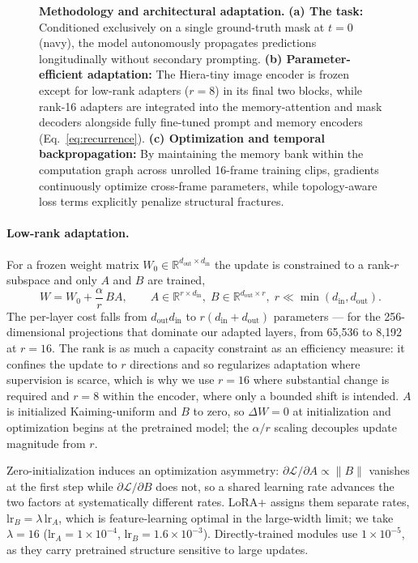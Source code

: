 \documentclass[11pt,a4paper]{article}
\begin{document}
\begin{figure}[!htb]
\begin{tikzpicture}
\end{tikzpicture}
\caption{\textbf{Methodology and architectural adaptation.}
\textbf{(a) The task:} Conditioned exclusively on a single ground-truth mask at $t=0$ (navy), the model autonomously propagates predictions longitudinally without secondary prompting.
\textbf{(b) Parameter-efficient adaptation:} The Hiera-tiny image encoder is frozen except for low-rank adapters ($r{=}8$) in its final two blocks, while rank-16 adapters are integrated into the memory-attention and mask decoders alongside fully fine-tuned prompt and memory encoders (Eq.~\ref{eq:recurrence}).
\textbf{(c) Optimization and temporal backpropagation:} By maintaining the memory bank within the computation graph across unrolled 16-frame training clips, gradients continuously optimize cross-frame parameters, while topology-aware loss terms explicitly penalize structural fractures.}
\label{fig:architecture}
\end{figure}


\paragraph{Low-rank adaptation.}
For a frozen weight matrix
$W_0 \in \mathbb{R}^{d_{\text{out}} \times d_{\text{in}}}$ the update is
constrained to a rank-$r$ subspace and only $A$ and $B$ are trained,
\begin{equation}
W = W_0 + \frac{\alpha}{r}\,BA,
\qquad
A \in \mathbb{R}^{r \times d_{\text{in}}},\;
B \in \mathbb{R}^{d_{\text{out}} \times r},\;
r \ll \min(d_{\text{in}}, d_{\text{out}}).
\label{eq:lora}
\end{equation}
The per-layer cost falls from $d_{\text{out}}d_{\text{in}}$ to
$r(d_{\text{in}}+d_{\text{out}})$ parameters --- for the 256-dimensional
projections that dominate our adapted layers, from 65{,}536 to 8{,}192 at
$r=16$. The rank is as much a capacity constraint as an efficiency measure:
it confines the update to $r$ directions and so regularizes adaptation where
supervision is scarce, which is why we use $r=16$ where substantial change
is required and $r=8$ within the encoder, where only a bounded shift is
intended. $A$ is initialized Kaiming-uniform and $B$ to zero, so
$\Delta W = 0$ at initialization and optimization begins at the pretrained
model; the $\alpha/r$ scaling decouples update magnitude from $r$.

Zero-initialization induces an optimization asymmetry:
$\partial\mathcal{L}/\partial A \propto \lVert B \rVert$ vanishes at the
first step while $\partial\mathcal{L}/\partial B$ does not, so a shared
learning rate advances the two factors at systematically different rates.
LoRA+ \cite{hayou2024loraplus} assigns them separate rates,
$\mathrm{lr}_B = \lambda\,\mathrm{lr}_A$, which is feature-learning optimal
in the large-width limit; we take $\lambda = 16$
($\mathrm{lr}_A = 1\times10^{-4}$, $\mathrm{lr}_B = 1.6\times10^{-3}$).
Directly-trained modules use $1\times10^{-5}$, as they carry pretrained
structure sensitive to large updates.
\end{document}
